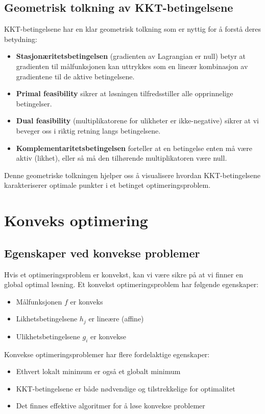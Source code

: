 \section{Geometrisk tolkning av KKT-betingelsene}

KKT-betingelsene har en klar geometrisk tolkning som er nyttig for å forstå deres betydning:

\begin{itemize}
\item \textbf{Stasjonæritetsbetingelsen} (gradienten av Lagrangian er null) betyr at gradienten til målfunksjonen kan uttrykkes som en lineær kombinasjon av gradientene til de aktive betingelsene.
\item \textbf{Primal feasibility} sikrer at løsningen tilfredsstiller alle opprinnelige betingelser.
\item \textbf{Dual feasibility} (multiplikatorene for ulikheter er ikke-negative) sikrer at vi beveger oss i riktig retning langs betingelsene.
\item \textbf{Komplementaritetsbetingelsen} forteller at en betingelse enten må være aktiv (likhet), eller så må den tilhørende multiplikatoren være null.
\end{itemize}

Denne geometriske tolkningen hjelper oss å visualisere hvordan KKT-betingelsene karakteriserer optimale punkter i et betinget optimeringsproblem.

\chapter{Konveks optimering}

\section{Egenskaper ved konvekse problemer}

Hvis et optimeringsproblem er konvekst, kan vi være sikre på at vi finner en global optimal løsning. Et konvekst optimeringsproblem har følgende egenskaper:
\begin{itemize}
\item Målfunksjonen $f$ er konveks
\item Likhetsbetingelsene $h_j$ er lineære (affine)
\item Ulikhetsbetingelsene $g_i$ er konvekse
\end{itemize}

Konvekse optimeringsproblemer har flere fordelaktige egenskaper:
\begin{itemize}
\item Ethvert lokalt minimum er også et globalt minimum
\item KKT-betingelsene er både nødvendige og tilstrekkelige for optimalitet
\item Det finnes effektive algoritmer for å løse konvekse problemer
\end{itemize}

